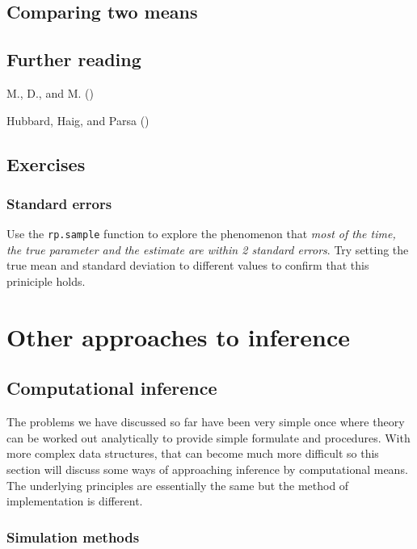 \documentclass[
]{book}
\begin{document}
\section{Comparing two means}\label{comparing-two-means}

\section{Further reading}\label{further-reading-1}

M., D., and M. ()

Hubbard, Haig, and Parsa ()

\section{Exercises}\label{quantifying-uncertainty-exercises}

\subsection{Standard errors}\label{standard-errors}

Use the \texttt{rp.sample} function to explore the phenomenon that \emph{most of the time, the true parameter and the estimate are within 2 standard errors}. Try setting the true mean and standard deviation to different values to confirm that this priniciple holds.

\chapter{Other approaches to inference}\label{other-approaches-to-inference}

\section{Computational inference}\label{computational-inference}

The problems we have discussed so far have been very simple once where theory can be worked out analytically to provide simple formulate and procedures. With more complex data structures, that can become much more difficult so this section will discuss some ways of approaching inference by computational means. The underlying principles are essentially the same but the method of implementation is different.

\subsection{Simulation methods}\label{simulation-methods}
\end{document}
